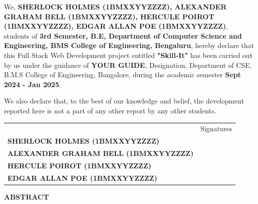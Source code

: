     \begin{spacing}{1.25}
        
        \noindent
        \large We, \textbf{SHERLOCK HOLMES (1BMXXYYZZZZ), ALEXANDER GRAHAM BELL (1BMXXYYZZZZ), HERCULE POIROT (1BMXXYYZZZZ), EDGAR ALLAN POE (1BMXXYYZZZZ)}, students of \textbf{3rd Semester, B.E, Department of Computer Science and Engineering, BMS College of Engineering, Bengaluru}, hereby declare that this Full Stack Web Development project entitled \textbf{"Skill-It"} has been carried out by us under the guidance of \textbf{YOUR GUIDE}, Designation, Department of CSE, B.M.S College of Engineering, Bangalore, during the academic semester \textbf{Sept 2024 - Jan 2025}.

        \noindent
        \Large We also declare that, to the best of our knowledge and belief, the development reported here is not a part of any other report by any other students.
        
        \vspace{1cm}
        \setlength\tabcolsep{0pt}
        \noindent
        \begingroup
        \fontsize{14pt}{12pt}
        \begin{tabulary}{0.95\linewidth}{LR}
            & Signatures \\
            \textbf{SHERLOCK HOLMES (1BMXXYYZZZZ)} & \\
            \textbf{ALEXANDER GRAHAM BELL (1BMXXYYZZZZ)} & \\
            \textbf{HERCULE POIROT (1BMXXYYZZZZ)} & \\
            \textbf{EDGAR ALLAN POE (1BMXXYYZZZZ)} & \\
        \end{tabulary}
        \endgroup
    \end{spacing}
\clearpage
    \begin{center}
    \Large \textbf{ABSTRACT}
    \end{center}
    \begin{spacing}{2.0}
        \lipsum[0-5]
    \end{spacing}
